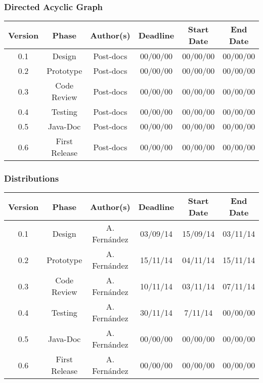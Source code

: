 \subsubsection*{Directed Acyclic Graph}

\begin{table}[H]
\begin{tabular}{cccccc}
\hline
\textbf{Version} & \textbf{Phase} & \textbf{Author(s)} & \textbf{Deadline} & \textbf{Start Date} & \textbf{End Date}\\
\hline
0.1 & Design & Post-docs & 00/00/00 & 00/00/00 & 00/00/00\\
\hline 
0.2 & Prototype & Post-docs & 00/00/00 & 00/00/00 & 00/00/00\\
\hline 
0.3 & Code Review & Post-docs & 00/00/00 & 00/00/00 & 00/00/00\\
\hline 
0.4 & Testing & Post-docs & 00/00/00 & 00/00/00 & 00/00/00\\
\hline 
0.5 & Java-Doc  & Post-docs & 00/00/00 & 00/00/00 & 00/00/00\\
\hline 
0.6 & First Release & Post-docs & 00/00/00 & 00/00/00 & 00/00/00\\
\hline
\end{tabular}
\end{table}


\subsubsection*{Distributions}
\begin{table}[H]
\begin{tabular}{cccccc}
\hline
\textbf{Version} & \textbf{Phase} & \textbf{Author(s)} & \textbf{Deadline} & \textbf{Start Date} & \textbf{End Date}\\
\hline
0.1 & Design & A. Fern\'andez & 03/09/14 & 15/09/14 & 03/11/14\\
\hline 
0.2 & Prototype & A. Fern\'andez & 15/11/14 & 04/11/14 & 15/11/14\\
\hline 
0.3 & Code Review & A. Fern\'andez & 10/11/14 & 03/11/14 & 07/11/14\\
\hline 
0.4 & Testing & A. Fern\'andez & 30/11/14 & 7/11/14 & 00/00/00\\
\hline 
0.5 & Java-Doc  & A. Fern\'andez & 00/00/00 & 00/00/00 & 00/00/00\\
\hline 
0.6 & First Release & A. Fern\'andez & 00/00/00 & 00/00/00 & 00/00/00\\
\hline
\end{tabular}
\end{table}


